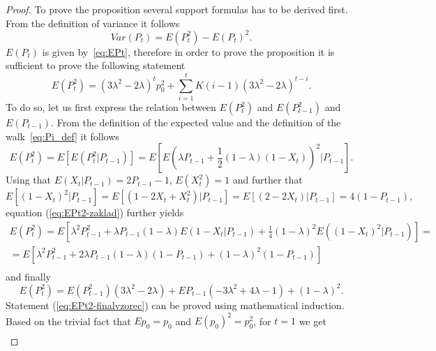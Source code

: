 \documentclass{amsart}
\theoremstyle{definition}
\theoremstyle{plain}
\theoremstyle{plain}
\theoremstyle{plain}
\numberwithin{equation}{section}
\begin{document}
    \begin{proof}
        To prove the proposition several support formulas has to be derived
        first.
        From the definition of variance it follows
        \begin{equation}
            Var(P_{t})=E(P_{t}^{2})-E(P_{t})^{2}.\label{eq:VarP-definition}
        \end{equation}
        $E(P_{t})$ is given by~\eqref{eq:EPt}, therefore in order to prove
        the proposition it is sufficient to prove the following statement
        \begin{equation}
            E(P_{t}^{2})=(3\lambda^{2}-2\lambda)^{t}p_{0}^{2}+\sum_{i=1}^{t}K(i-1)(3\lambda^{2}-2\lambda)^{t-i}.\label{eq:EPt2-finalvzorec}
        \end{equation}
        To do so, let us first express the relation between $E(P_{t}^{2})$
        and $E(P_{t-1}^{2})$ and $E(P_{t-1}).$ From the definition of the
        expected value and the definition of the walk~\eqref{eq:Pi_def} it follows
        \begin{equation}
            E(P_{t}^{2})=E[E(P_{t}^{2}|P_{t-1})]=E[E(\lambda P_{t-1}+\frac{1}{2}(1-\lambda)(1-X_{t}))^{2}|P_{t-1}].\label{eq:EPt2-zaklad}
        \end{equation}
        Using that $E(X_{t}|P_{t-1})=2P_{t-1}-1$, $E(X_{t}^{2})=1$ and further
        that
        \[
            E[(1-X_{t})^{2}|P_{t-1}]=E[(1-2X_{t}+X_{t}^{2})|P_{t-1}]
            =E[(2-2X_{t})|P_{t-1}]= 4(1-P_{t-1}),
        \]
        {\color{blue}equation} (\ref{eq:EPt2-zaklad}) further yields
        \begin{gather*}
            E(P_{t}^{2})=E[\lambda^{2}P_{t-1}^{2}+\lambda P_{t-1}(1-\lambda)E(1-X_{t}|P_{t-1})+\frac{1}{4}(1-\lambda)^{2}E((1-X_{t})^{2}|P_{t-1})]=\\
            =E[\lambda^{2}P_{t-1}^{2}+2\lambda P_{t-1}(1-\lambda)(1-P_{t-1})+(1-\lambda)^{2}(1-P_{t-1})]\\
        \end{gather*}
        and finally
        \begin{equation}
            E(P_{t}^{2})=E(P_{t-1}^{2})(3\lambda^{2}-2\lambda)+EP_{t-1}(-3\lambda^{2}+4\lambda-1)+(1-\lambda)^{2}.\label{eq:EPt2-pokrocile}
        \end{equation}
        Statement (\ref{eq:EPt2-finalvzorec}) can be proved using mathematical induction.
        Based on the trivial fact that $Ep_{0}=p_{0}$ and $E(p_{0})^{2}=p_{0}^{2}$,
        for $t=1$ we get
        \begin{gather*}

\end{gather*}
\end{proof}
\end{document}
